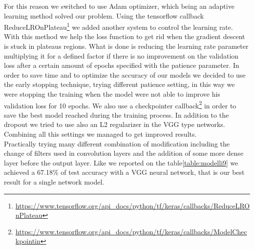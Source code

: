 \documentclass[10pt,twocolumn,letterpaper]{article}
\begin{document}
For this reason we switched to use Adam optimizer, which being an adaptive learning method solved our problem.
Using the tensorflow callback ReduceLROnPlateau\footnote{\url{https://www.tensorflow.org/api_docs/python/tf/keras/callbacks/ReduceLROnPlateau}} we added another system to control the learning rate. \\
With this method we help the loss function to get rid when the gradient descent is stuck in plateaus regions. What is done is reducing the learning rate parameter multiplying it for a defined factor if there is no improvement on the validation loss after a certain amount of epochs specified with the patience parameter. In order to save time and to optimize the accuracy of our models we decided to use the early stopping technique, trying different patience setting, in this way we were stopping the training when the model were not able to improve his validation loss for 10 epochs. We also use a checkpointer callback\footnote{\url{https://www.tensorflow.org/api_docs/python/tf/keras/callbacks/ModelCheckpointin}} in order to save the best model reached during the training process. In addition to the dropout we tried to use also an L2 regularizer in the VGG type networks. Combining all this settings we managed to get improved results.\\
Practically trying many different combination of modification including the change of filters used in convolution layers and the addition of some more dense layer before the output layer. Like we reported on the table\ref{table:modelli9} we achieved a 67.18\% of test accuracy with a VGG neural network, that is our best result for a single network model. 
\end{document}
